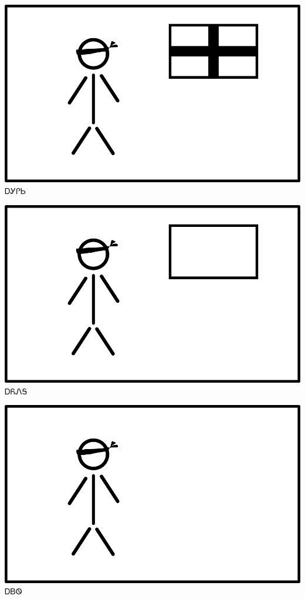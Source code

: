 \documentclass[avery5371]{flashcards}%
\begin{document}
\begin{flashcard}{
\includegraphics[width=0.95\columnwidth,height=.51\columnwidth,keepaspectratio]{../artwork/flags/agilisi-flag-blind}
}\Huge ᎠᎩᎵᏏ
\end{flashcard}

\begin{flashcard}{
\includegraphics[width=0.95\columnwidth,height=.51\columnwidth,keepaspectratio]{../artwork/flags/ayonega-flag-blind}
}\Huge ᎠᏲᏁᎦ
\end{flashcard}

\begin{flashcard}{
\includegraphics[width=0.95\columnwidth,height=.51\columnwidth,keepaspectratio]{../artwork/flags/ayvwi-no-flag-blind}
}\Huge ᎠᏴᏫ
\end{flashcard}
\end{document}
